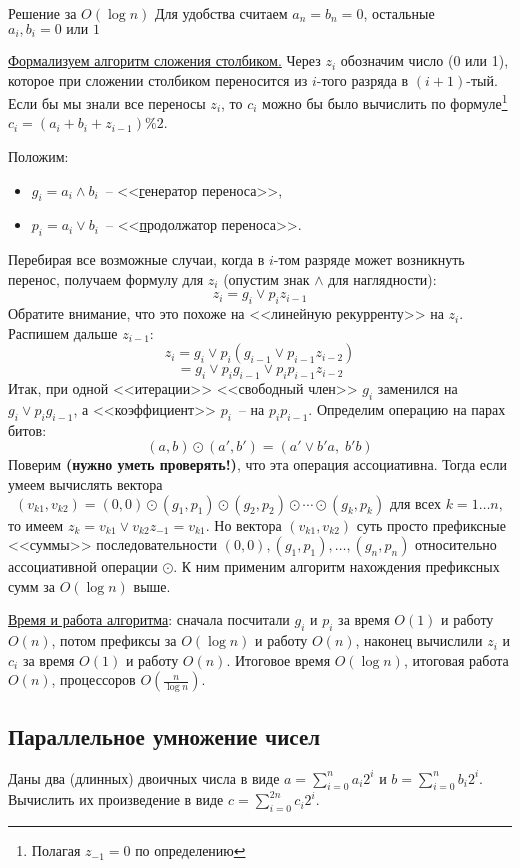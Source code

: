 \begin{algodescription}{Решение за $O(\log n)$}
    Для удобства считаем $a_n = b_n = 0$, остальные $a_i, b_i = 0\text{ или }1$

\underline{Формализуем алгоритм сложения столбиком.} Через $z_i$ обозначим число (0 или 1), которое при сложении столбиком переносится из $i$-того разряда в $(i+1)$-тый. Если бы мы знали все переносы $z_i$, то $c_i$ можно бы было вычислить по формуле\footnote{Полагая $z_{-1}=0$ по определению} $c_i = (a_i+b_i+z_{i-1})\%2$.

Положим:
\begin{itemize}
\item $g_i = a_i \land b_i$~-- <<\underline{г}енератор переноса>>,
\item $p_i = a_i \lor b_i$~-- <<\underline{п}родолжатор переноса>>.
\end{itemize}
Перебирая все возможные случаи, когда в $i$-том разряде может возникнуть перенос, получаем формулу для $z_i$ (опустим знак $\land$ для наглядности):
$$z_i = g_i \lor p_i z_{i-1}$$
Обратите внимание, что это похоже на <<линейную рекурренту>> на $z_i$. Распишем дальше $z_{i-1}$:
$$z_i = g_i \lor p_i(g_{i-1} \lor p_{i-1} z_{i-2})$$ $$ =g_i \lor p_i g_{i-1} \lor p_i p_{i-1} z_{i-2}$$
Итак, при одной <<итерации>> <<свободный член>> $g_i$ заменился на $g_i \lor p_i g_{i-1}$, а <<коэффициент>> $p_i$~-- на $p_i p_{i-1}$.
Определим операцию на парах битов: $$(a,b) \odot (a', b') = (a' \lor b' a, \;b' b)$$
Поверим \textbf{(нужно уметь проверять!)}, что эта операция ассоциативна.
Тогда если умеем вычислять вектора $$(v_{k1}, v_{k2}) = (0, 0)\odot (g_1, p_1)\odot (g_2, p_2)\odot \cdots \odot (g_k, p_k) \text{ для всех } k=1\ldots n,$$ то имеем $z_k = v_{k1} \lor v_{k2}z_{-1} = v_{k1}$. Но вектора $(v_{k1}, v_{k2})$ суть просто префиксные <<суммы>> последовательности $(0, 0), (g_1, p_1), \ldots, (g_n, p_n)$ относительно ассоциативной операции $\odot$. К ним применим алгоритм нахождения префиксных сумм за $O(\log n)$ выше.

\underline{Время и работа алгоритма}: сначала посчитали $g_i$ и $p_i$ за время $O(1)$ и работу $O(n)$, потом префиксы за $O(\log n)$ и работу $O(n)$, наконец вычислили $z_i$ и $c_i$ за время $O(1)$  и работу $O(n)$. Итоговое время $O(\log n)$, итоговая работа $O(n)$, процессоров $O\left(\frac{n}{\log n}\right)$.
\end{algodescription}

\subsection{Параллельное умножение чисел}
\begin{problem*}
	Даны два (длинных) двоичных числа в виде $a = \sum_{i=0}^n a_i 2^i$ и $b = \sum_{i=0}^n b_i 2^i$. Вычислить их произведение в виде $c = \sum_{i=0}^{2n} c_i 2^i$.
\end{problem*}

